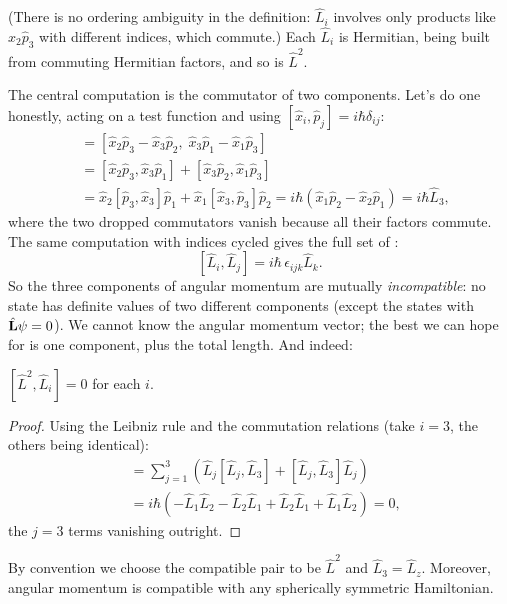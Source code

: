 \documentclass[a4paper]{scrartcl}
\begin{document}
(There is no ordering ambiguity in the definition: $\hat L_i$ involves only products like $\hat{x}_2 \hat{p}_3$ with different indices, which commute.) Each $\hat{L}_i$ is Hermitian, being built from commuting Hermitian factors, and so is $\hat{L}^2$.

The central computation is the commutator of two components. Let's do one honestly, acting on a test function and using $[\hat x_i, \hat p_j] = i\hbar\delta_{ij}$:
\begin{align*}
    [\hat{L}_1, \hat{L}_2] &= [\hat{x}_2 \hat{p}_3 - \hat{x}_3 \hat{p}_2, \; \hat{x}_3 \hat{p}_1 - \hat{x}_1 \hat{p}_3] \\
    &= [\hat{x}_2 \hat{p}_3, \hat{x}_3 \hat{p}_1] + [\hat x_3 \hat p_2, \hat x_1 \hat p_3] \\
    &= \hat{x}_2 [\hat{p}_3, \hat{x}_3] \hat{p}_1 + \hat{x}_1 [\hat{x}_3, \hat{p}_3] \hat{p}_2
    = i \hbar ( \hat{x}_1 \hat{p}_2 - \hat{x}_2 \hat{p}_1 ) = i \hbar \hat{L}_3,
\end{align*}
where the two dropped commutators vanish because all their factors commute. The same computation with indices cycled gives the full set of :
$$
[\hat{L}_i, \hat{L}_j] = i \hbar \, \epsilon_{ijk} \hat{L}_k.
$$
So the three components of angular momentum are mutually \emph{incompatible}: no state has definite values of two different components (except the states with $\hat{\mathbf{L}}\psi = 0$). We cannot know the angular momentum vector; the best we can hope for is one component, plus the total length. And indeed:

\begin{proposition}
    $[\hat{L}^2, \hat{L}_i] = 0$ for each $i$.
\end{proposition}
\begin{proof}
    Using the Leibniz rule and the commutation relations (take $i = 3$, the others being identical):
    \begin{align*}
        [\hat{L}^2, \hat{L}_3] &= \sum_{j=1}^3 \left( \hat{L}_j [\hat{L}_j, \hat{L}_3] + [\hat{L}_j, \hat{L}_3]\hat{L}_j \right)\\
        &= i\hbar\left( -\hat{L}_1 \hat{L}_2 - \hat{L}_2 \hat{L}_1 + \hat{L}_2 \hat{L}_1 + \hat{L}_1 \hat{L}_2 \right) = 0,
    \end{align*}
    the $j = 3$ terms vanishing outright.
\end{proof}

By convention we choose the compatible pair to be $\hat{L}^2$ and $\hat{L}_3 = \hat{L}_z$. Moreover, angular momentum is compatible with any spherically symmetric Hamiltonian.
\end{document}
